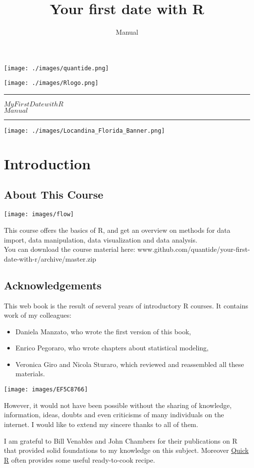\documentclass[]{book}
\title{Your first date with R}
\subtitle{Manual}
\author{}
\date{}
\providecommand{\tightlist}{%
  \setlength{\itemsep}{0pt}\setlength{\parskip}{0pt}}
\def\tightlist{}
\def\maketitle{%
  \null
  \thispagestyle{empty}%
  \hspace{-2cm}
   \begin{flushleft}\texttt{[image: ./images/quantide.png]}\end{flushleft}
  \vspace{-2cm}
  \begin{flushright}\texttt{[image: ./images/Rlogo.png]}\end{flushright}
  \vskip 3cm
  \hrule height 2pt
  \begin{center} \par \huge \strut \textbf{$My  First  Date  with  R$}\\ $Manual$ \par  \end{center}
  \vspace{0.5cm}
  \hrule height 2pt
  \vspace{0.5cm}
  \vspace{2cm}
  \texttt{[image: ./images/Locandina\_Florida\_Banner.png]}
  \clearpage
}
\begin{document}
\maketitle

{
\setcounter{tocdepth}{1}
\tableofcontents
}
\chapter{Introduction}\label{introduction}

\section{About This Course}\label{about-this-course}

\texttt{[image: images/flow]}

This course offers the basics of R, and get an overview on methods for
data import, data manipulation, data visualization and data analysis.\\
You can download the course material here:
www.github.com/quantide/your-first-date-with-r/archive/master.zip

\clearpage

\section{Acknowledgements}\label{acknowledgements}

This web book is the result of several years of introductory R courses.
It contains work of my colleagues:

\begin{itemize}
\tightlist
\item
  Daniela Manzato, who wrote the first version of this book,
\item
  Enrico Pegoraro, who wrote chapters about statistical modeling,
\item
  Veronica Giro and Nicola Sturaro, which reviewed and reassembled all
  these materials.
\end{itemize}

\texttt{[image: images/EF5C8766]}

However, it would not have been possible without the sharing of
knowledge, information, ideas, doubts and even criticisms of many
individuals on the internet. I would like to extend my sincere thanks to
all of them.

I am grateful to Bill Venables and John Chambers for their publications
on R that provided solid foundations to my knowledge on this subject.
Moreover \href{http://www.statmethods.net/}{Quick R} often provides some
useful ready-to-cook recipe.
\end{document}
